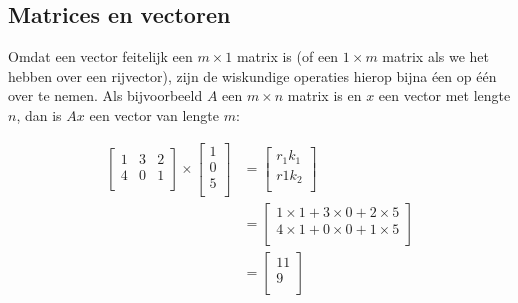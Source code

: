 \subsection{Matrices en vectoren}
Omdat een vector feitelijk een $m \times 1$ matrix is (of een $1 \times m$ matrix als we het hebben over een rijvector), zijn de wiskundige operaties hierop bijna éen op één over te nemen. Als bijvoorbeeld $A$ een $m \times n$ matrix is en $x$ een vector met lengte $n$, dan is $Ax$ een vector van lengte $m$:

\[
\begin{aligned}
\begin{bmatrix}
1 & 3 & 2\\
4 & 0 & 1\\
\end{bmatrix} \times
\begin{bmatrix}
1 \\
0 \\
5 \\
\end{bmatrix} &=
\begin{bmatrix}
r_1k_1 \\
r1k_2\\
\end{bmatrix} \\
&=
\begin{bmatrix}
1 \times  1 + 3 \times 0 + 2 \times 5\\
4 \times 1 + 0 \times 0 + 1 \times 5 \\
\end{bmatrix}\\
&=
\begin{bmatrix}
11\\
9\\
\end{bmatrix}
\end{aligned}
\]

